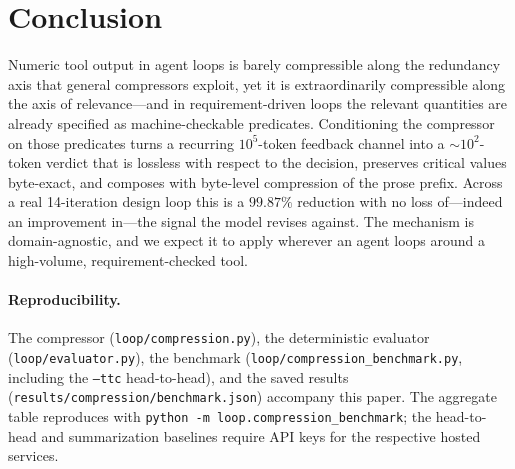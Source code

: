 \documentclass[10pt,twocolumn]{article}
\begin{document}
\section{Conclusion}
\label{sec:conclusion}

Numeric tool output in agent loops is barely compressible along the redundancy axis
that general compressors exploit, yet it is extraordinarily compressible along the
axis of relevance---and in requirement-driven loops the relevant quantities are
already specified as machine-checkable predicates. Conditioning the compressor on
those predicates turns a recurring $10^5$-token feedback channel into a
$\sim\!10^2$-token verdict that is lossless with respect to the decision, preserves
critical values byte-exact, and composes with byte-level compression of the prose
prefix. Across a real 14-iteration design loop this is a $99.87\%$ reduction with no
loss of---indeed an improvement in---the signal the model revises against. The
mechanism is domain-agnostic, and we expect it to apply wherever an agent loops
around a high-volume, requirement-checked tool.

\paragraph{Reproducibility.}
The compressor (\texttt{loop/compression.py}), the deterministic evaluator
(\texttt{loop/evaluator.py}), the benchmark
(\texttt{loop/compression\_benchmark.py}, including the \texttt{--ttc} head-to-head),
and the saved results (\texttt{results/compression/benchmark.json}) accompany this
paper. The aggregate table reproduces with
\texttt{python -m loop.compression\_benchmark}; the head-to-head and summarization
baselines require API keys for the respective hosted services.
\end{document}
